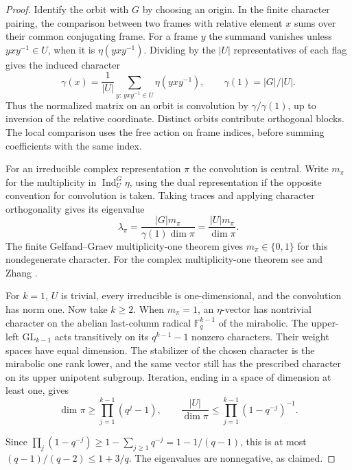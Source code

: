 \begin{proof}
Identify the orbit with \(G\) by choosing an origin. In the finite character pairing, the comparison between two frames with relative element \(x\) sums over their common conjugating frame. For a frame \(y\) the summand vanishes unless \(yxy^{-1}\in U\), when it is \(\eta(yxy^{-1})\). Dividing by the \(|U|\) representatives of each flag gives the induced character
\[
 \gamma(x)=\frac1{|U|}\sum_{y:\,yxy^{-1}\in U}\eta(yxy^{-1}),
 \qquad \gamma(1)=|G|/|U|.
\]
Thus the normalized matrix on an orbit is convolution by \(\gamma/\gamma(1)\), up to inversion of the relative coordinate. Distinct orbits contribute orthogonal blocks. The local comparison uses the free action on frame indices, before summing coefficients with the same index.

For an irreducible complex representation \(\pi\) the convolution is central. Write \(m_\pi\) for the multiplicity in \(\operatorname{Ind}_U^G\eta\), using the dual representation if the opposite convention for convolution is taken. Taking traces and applying character orthogonality gives its eigenvalue
\[
          \lambda_\pi=\frac{|G|m_\pi}{\gamma(1)\dim\pi}
                      =\frac{|U|m_\pi}{\dim\pi}.
\] The finite Gelfand--Graev multiplicity-one theorem gives \(m_\pi\in\{0,1\}\) for this nondegenerate character. For the complex multiplicity-one theorem see \cite{gelfand-graev-finite} and Zhang \cite[Section~5.1]{zhang-modular-gelfand}.

For \(k=1\), \(U\) is trivial, every irreducible is one-dimensional, and the convolution has norm one. Now take \(k\ge2\). When \(m_\pi=1\), an \(\eta\)-vector has nontrivial character on the abelian last-column radical \(\mathbb F_q^{k-1}\) of the mirabolic. The upper-left \(\mathrm{GL}_{k-1}\) acts transitively on its \(q^{k-1}-1\) nonzero characters. Their weight spaces have equal dimension. The stabilizer of the chosen character is the mirabolic one rank lower, and the same vector still has the prescribed character on its upper unipotent subgroup. Iteration, ending in a space of dimension at least one, gives
\[
 \dim\pi\ge\prod_{j=1}^{k-1}(q^j-1),\qquad
 \frac{|U|}{\dim\pi}\le\prod_{j=1}^{k-1}(1-q^{-j})^{-1}.
\]

Since \(\prod_j(1-q^{-j})\ge1-\sum_{j\ge1}q^{-j}=1-1/(q-1)\), this is at most \((q-1)/(q-2)\le1+3/q\). The eigenvalues are nonnegative, as claimed.
\end{proof}



